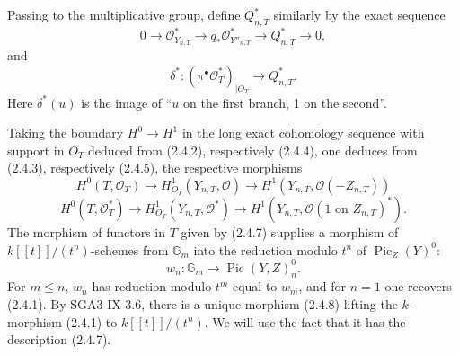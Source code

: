 \documentclass[11pt]{article}
\DeclareMathOperator{\Pic}{Pic}
\newcommand{\OO}{\mathcal O}
\newcommand{\GG}{\mathbb G}
\begin{document}
Passing to the multiplicative group, define $Q^*_{n,T}$ similarly by the exact sequence
\begin{equation}
        0\longrightarrow\OO^*_{Y_{n,T}}\longrightarrow q_*\OO^*_{Y''_{n,T}}\longrightarrow Q^*_{n,T}\longrightarrow0, \tag{2.4.4}
\end{equation}
and
\begin{equation}
        \delta^*:(\pi^\bullet\OO^*_T)_{|O_T}\longrightarrow Q^*_{n,T}. \tag{2.4.5}
\end{equation}
Here $\delta^*(u)$ is the image of ``$u$ on the first branch, 1 on the second''.

Taking the boundary $H^0\to H^1$ in the long exact cohomology sequence with support in $O_T$ deduced from (2.4.2), respectively (2.4.4), one deduces from (2.4.3), respectively (2.4.5), the respective morphisms
\begin{equation}
        H^0(T,\OO_T)\longrightarrow H^1_{O_T}(Y_{n,T},\OO)
        \longrightarrow H^1(Y_{n,T},\OO(-Z_{n,T})) \tag{2.4.6}
\end{equation}
\begin{equation}
        H^0(T,\OO_T^*)\longrightarrow H^1_{O_T}(Y_{n,T},\OO^*)
        \longrightarrow H^1(Y_{n,T},\OO(1\text{ on }Z_{n,T})^*). \tag{2.4.7}
\end{equation}
The morphism of functors in $T$ given by (2.4.7) supplies a morphism of $k[[t]]/(t^n)$-schemes from $\GG_m$ into the reduction modulo $t^n$ of $\Pic_Z(Y)^0$:
\begin{equation}
        w_n:\GG_m\longrightarrow \Pic(Y,Z)^0_n. \tag{2.4.8}
\end{equation}
For $m\le n$, $w_n$ has reduction modulo $t^m$ equal to $w_m$, and for $n=1$ one recovers (2.4.1). By SGA3 IX 3.6, there is a unique morphism (2.4.8) lifting the $k$-morphism (2.4.1) to $k[[t]]/(t^n)$. We will use the fact that it has the description (2.4.7).
\end{document}
